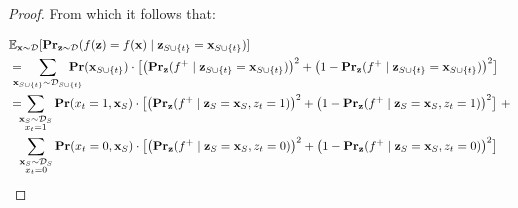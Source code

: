 \documentclass{article}
\newcommand{\z}{\textbf{z}}
\newcommand{\x}{\textbf{x}}
\newcommand{\fml}[1]{{\mathcal{#1}}}
\newcommand{\mbf}[1]{\ensuremath\mathbf{#1}}
\newcommand{\mbb}[1]{\ensuremath\mathbb{#1}}
\begin{document}
\begin{proof}
From which it follows that:

\begin{equation} \label{eq:gbx02}
\begin{aligned}
&\mbb{E}_{\x\sim \mathcal{D}}[\mbf{Pr}_{\z\sim \mathcal{D}}(f(\z) = f(\x) \mid \z_{S\cup\{t\}} = \x_{S\cup\{t\}})] \\
&= \hspace*{-1em} \sum_{\x_{S\cup\{t\}}\sim \fml{D}_{S\cup\{t\}}} \hspace*{-1.3em}
\mbf{Pr}(\x_{S\cup\{t\}}) \cdot \bigl[\bigl(\mbf{Pr}_{\z}(f^{+} \mid \z_{S\cup\{t\}} = \x_{S\cup\{t\}})\bigr)^2 + \bigl(1 - \mbf{Pr}_{\z}(f^{+} \mid \z_{S\cup\{t\}} = \x_{S\cup\{t\}})\bigr)^2\bigr] \\
&= \hspace*{-.5em} \sum_{\substack{\x_{S}\sim \fml{D}_{S} \\ x_t = 1}}
\mbf{Pr}(x_t = 1, \x_{S}) \cdot \bigl[\bigl(\mbf{Pr}_{\z}(f^{+} \mid \z_{S} = \x_{S}, z_t = 1)\bigr)^2 + \bigl(1 - \mbf{Pr}_{\z}(f^{+} \mid \z_{S} = \x_{S}, z_t = 1)\bigr)^2\bigr] \ + \\
&\hspace{.7em} \sum_{\substack{\x_{S}\sim \fml{D}_{S} \\ x_t = 0}}
\mbf{Pr}(x_t = 0, \x_{S}) \cdot \bigl[\bigl(\mbf{Pr}_{\z}(f^{+} \mid \z_{S} = \x_{S}, z_t = 0)\bigr)^2 + \bigl(1 - \mbf{Pr}_{\z}(f^{+} \mid \z_{S} = \x_{S}, z_t = 0)\bigr)^2\bigr]
\end{aligned}
\end{equation}


\end{proof}
\end{document}

